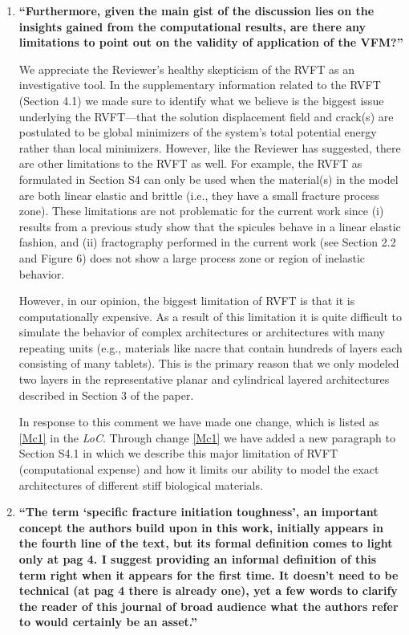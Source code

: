 \documentclass[11pt,letterpaper]{report}
\begin{document}
\begin{enumerate}[label=\textit{2.\arabic*},wide, labelwidth=!, labelindent=0pt]
\item \label{r2c2} {\bf ``Furthermore, given the main gist of the discussion lies on the insights gained from the computational results, are there any limitations to point out on the validity of application of the VFM?''}

We appreciate the Reviewer's healthy skepticism of the RVFT as an investigative tool. In the supplementary information related to the RVFT (Section 4.1) we made sure to identify what we believe is the biggest issue underlying the RVFT---that the solution displacement field and crack(s) are postulated to be global minimizers of the system's total potential energy rather than local minimizers. However, like the Reviewer has suggested, there are other limitations to the RVFT as well. For example, the RVFT as formulated in Section S4 can only be used when the material(s) in the model are both linear elastic and brittle (i.e., they have a small fracture process zone). These limitations are not problematic for the current work since (i) results from a previous study \cite{monn2017enhanced} show that the spicules behave in a linear elastic fashion, and (ii) fractography performed in the current work (see Section 2.2 and Figure 6) does not show a large process zone or region of inelastic behavior.

However, in our opinion, the biggest limitation of RVFT is that it is computationally expensive. As a result of this limitation it is quite difficult to simulate the behavior of complex architectures or architectures with many repeating units (e.g., materials like nacre that contain hundreds of layers each consisting of many tablets). This is the primary reason that we only modeled two layers in the representative planar and cylindrical layered architectures described in Section 3 of the paper.

In response to this comment we have made one change, which is listed as \ref{Mc1} in the \textit{LoC}.
%
Through change \ref{Mc1} we have added a new paragraph to Section S4.1 in which we describe this major limitation of RVFT (computational expense) and how it limits our ability to model the exact architectures of different stiff biological materials.

\item \label{r2c3} {\bf ``The term `specific fracture initiation toughness', an important concept the authors build upon in this work, initially appears in the fourth line of the text, but its formal definition comes to light only at pag 4. I suggest providing an informal definition of this term right when it appears for the first time. It doesn't need to be technical (at pag 4 there is already one), yet a few words to clarify the reader of this journal of broad audience what the authors refer to would certainly be an asset.''}


\end{enumerate}
\end{document}
